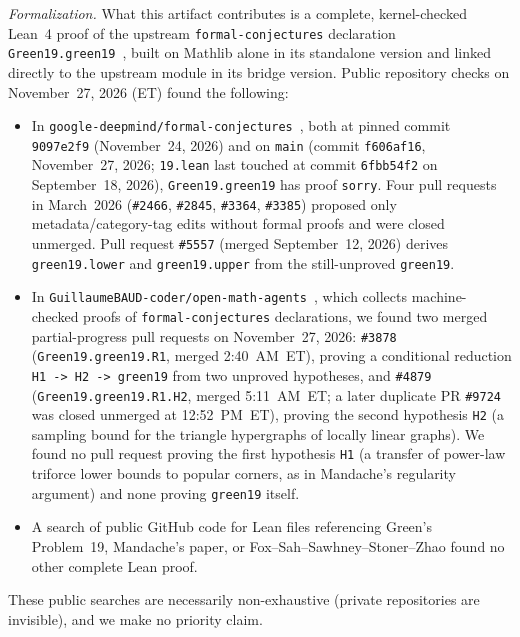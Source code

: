 \documentclass[11pt,reqno]{amsart}
\theoremstyle{remark}
\newcommand{\LeanUS}{\textunderscore\hspace{0pt}}
\newcommand{\lean}[1]{{\let\_\LeanUS\texttt{#1}}}
\begin{document}
\emph{Formalization.} What this artifact contributes is a complete, kernel-checked Lean~4 proof of the upstream \lean{formal-conjectures} declaration \lean{Green19.\allowbreak{}green\_19}~\cite{FC}, built on Mathlib alone in its standalone version and linked directly to the upstream module in its bridge version. Public repository checks on November~27, 2026 (ET) found the following:
\begin{itemize}[leftmargin=1.8em]
\item In \lean{google-deepmind/\allowbreak{}formal-conjectures}~\cite{FC}, both at pinned commit \lean{9097e2f9} (November~24, 2026) and on \lean{main} (commit \lean{f606af16}, November~27, 2026; \lean{19.\allowbreak{}lean} last touched at commit \lean{6fbb54f2} on September~18, 2026), \lean{Green19.\allowbreak{}green\_19} has proof \lean{sorry}. Four pull requests in March~2026 (\lean{\#2466}, \lean{\#2845}, \lean{\#3364}, \lean{\#3385}) proposed only metadata/category-tag edits without formal proofs and were closed unmerged. Pull request \lean{\#5557} (merged September~12, 2026) derives \lean{green\_19.\allowbreak{}lower} and \lean{green\_19.\allowbreak{}upper} from the still-unproved \lean{green\_19}.
\item In \lean{GuillaumeBAUD-coder/\allowbreak{}open-math-agents}~\cite{OMA}, which collects machine-checked proofs of \lean{formal-conjectures} declarations, we found two merged partial-progress pull requests on November~27, 2026: \lean{\#3878} (\lean{Green19.\allowbreak{}green\_19.\allowbreak{}R1}, merged 2:40~AM~ET), proving a conditional reduction \lean{H1 -> H2 -> green\_19} from two unproved hypotheses, and \lean{\#4879} (\lean{Green19.\allowbreak{}green\_19.\allowbreak{}R1.\allowbreak{}H2}, merged 5:11~AM~ET; a later duplicate PR \lean{\#9724} was closed unmerged at 12:52~PM~ET), proving the second hypothesis \lean{H2} (a sampling bound for the triangle hypergraphs of locally linear graphs). We found no pull request proving the first hypothesis \lean{H1} (a transfer of power-law triforce lower bounds to popular corners, as in Mandache's regularity argument) and none proving \lean{green\_19} itself.
\item A search of public GitHub code for Lean files referencing Green's Problem~19, Mandache's paper, or Fox--Sah--Sawhney--Stoner--Zhao found no other complete Lean proof.
\end{itemize}
These public searches are necessarily non-exhaustive (private repositories are invisible), and we make no priority claim.
\end{document}
